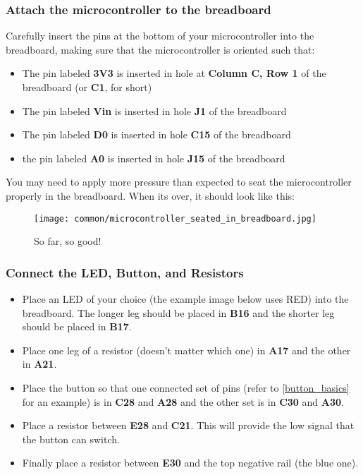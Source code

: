 \subsubsection{Attach the microcontroller to the breadboard}
Carefully insert the pins at the bottom of your microcontroller into the breadboard, making sure that the microcontroller is oriented such that:
\begin{itemize}
    \item The pin labeled \textbf{3V3} is inserted in hole at \textbf{Column C, Row 1} of the breadboard (or \textbf{C1}, for short)
    \item The pin labeled \textbf{Vin} is inserted in hole \textbf{J1} of the breadboard
    \item The pin labeled \textbf{D0} is inserted in hole \textbf{C15} of the breadboard
    \item the pin labeled \textbf{A0} is inserted in hole \textbf{J15} of the breadboard
\end{itemize}
You may need to apply more pressure than expected to seat the microcontroller properly in the breadboard. When its over, it should look like this:

\begin{figure}[H]
    \centering
    \texttt{[image: common/microcontroller\_seated\_in\_breadboard.jpg]}
    \caption{So far, so good!}
\end{figure}

\subsubsection{Connect the LED, Button, and Resistors}
\begin{itemize}
    \item Place an LED of your choice (the example image below uses RED) into the breadboard. The longer leg
    should be placed in \textbf{B16} and the shorter leg should be placed in \textbf{B17}.
    \item Place one leg of a resistor (doesn't matter which one) in \textbf{A17} and the other in
    \textbf{A21}.
    \item Place the button so that one connected set of pins (refer to \ref{button_basics} for an
    example) is in \textbf{C28} and \textbf{A28} and the other set is in \textbf{C30} and \textbf{A30}.
    \item Place a resistor between \textbf{E28} and \textbf{C21}. This will provide the low signal that
    the button can switch.
    \item Finally place a resistor between \textbf{E30} and the top negative rail (the blue one).
\end{itemize}

